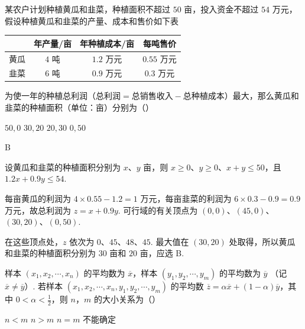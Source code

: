 \begin{problem}
某农户计划种植黄瓜和韭菜，种植面积不超过 \(50\text{ 亩}\)，投入资金不超过 \(54\text{ 万元}\)，假设种植黄瓜和韭菜的产量、成本和售价如下表

\begin{center}
\begin{tabular}{c|c|c|c}
\hline
 & 年产量/亩 & 年种植成本/亩 & 每吨售价 \\
\hline
黄瓜 & \(4\text{ 吨}\) & \(1.2\text{ 万元}\) & \(0.55\text{ 万元}\) \\
\hline
韭菜 & \(6\text{ 吨}\) & \(0.9\text{ 万元}\) & \(0.3\text{ 万元}\) \\
\hline
\end{tabular}
\end{center}

为使一年的种植总利润（\(\text{总利润} = \text{总销售收入} - \text{总种植成本}\)）最大，那么黄瓜和韭菜的种植面积（单位：亩）分别为（\quad）

\choices
    {\(50,0\)}
    {\(30,20\)}
    {\(20,30\)}
    {\(0,50\)}
\end{problem}

\begin{answer}
B
\end{answer}

\begin{solution}
设黄瓜和韭菜的种植面积分别为 \(x\)、\(y\) 亩，则
\(x\geqslant0\)、\(y\geqslant0\)、\(x+y\leqslant50\)，且 \(1.2x+0.9y\leqslant54\).

每亩黄瓜的利润为 \(4\times0.55-1.2=1\) 万元，每亩韭菜的利润为 \(6\times0.3-0.9=0.9\) 万元，故总利润为 \(z=x+0.9y\). 可行域的有关顶点为
\((0,0)\)、\((45,0)\)、\((30,20)\)、\((0,50)\).

在这些顶点处，\(z\) 依次为 \(0\)、\(45\)、\(48\)、\(45\). 最大值在 \((30,20)\) 处取得，所以黄瓜和韭菜的种植面积分别为 \(30\) 亩和 \(20\) 亩，应选 B.
\end{solution}

\begin{problem}
样本 \((x_{1}, x_{2}, \cdots, x_{n})\) 的平均数为 \(\overline{x}\)，样本 \((y_{1}, y_{2}, \cdots, y_{m})\) 的平均数为 \(\overline{y}\) （记 \(\overline{x} \neq \overline{y}\)）. 若样本 \((x_{1}, x_{2}, \cdots, x_{n}, y_{1}, y_{2}, \cdots, y_{m})\) 的平均数 \(\overline{z} = \alpha \overline{x} + (1 - \alpha)\overline{y}\)，其中 \(0 < \alpha < \frac{1}{2}\)，则 \(n\)，\(m\) 的大小关系为（\quad）

\choices
    {\(n < m\)}
    {\(n > m\)}
    {\(n = m\)}
    {不能确定}
\end{problem}

